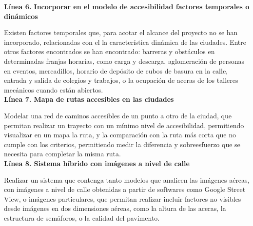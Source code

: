\textbf{Línea 6. Incorporar en el modelo de accesibilidad factores temporales o dinámicos}

Existen factores temporales que, para acotar el alcance del proyecto no se han incorporado, relacionadas con el la característica dinámica de las ciudades. Entre otros factores encontrados se han encontrado: barreras y obstáculos en determinadas franjas horarias, como carga y descarga, aglomeración de personas en eventos, mercadillos, horario de depósito de cubos de basura en la calle, entrada y salida de colegios y trabajos, o la ocupación de aceras de los talleres mecánicos cuando están abiertos.
\\

\textbf{Línea 7. Mapa de rutas accesibles en las ciudades}

Modelar una red de caminos accesibles de un punto a otro de la ciudad, que permitan realizar un trayecto con un mínimo nivel de accesibilidad, permitiendo visualizar en un mapa la ruta, y la comparación con la ruta más corta que no cumple con los criterios, permitiendo medir la diferencia y sobreesfuerzo que se necesita para completar la misma ruta.
\\

\textbf{Línea 8. Sistema híbrido con imágenes a nivel de calle}

Realizar un sistema que contenga tanto modelos que analicen las imágenes aéreas, con imágenes a nivel de calle obtenidas a partir de softwares como Google Street View, o imágenes particulares, que permitan realizar incluir factores no visibles desde imágenes en dos dimensiones aéreas, como la altura de las aceras, la estructura de semáforos, o la calidad del pavimento.
\\